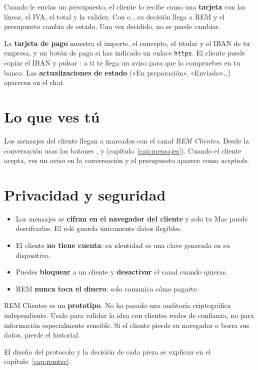 Cuando le envías un presupuesto, el cliente lo recibe como una \textbf{tarjeta} con las líneas, el IVA, el total y la validez. Con  o , su decisión llega a REM y el presupuesto cambia de estado. Una vez decidido, no se puede cambiar.

La \textbf{tarjeta de pago} muestra el importe, el concepto, el titular y el IBAN de tu empresa, y un botón de pago si has indicado un enlace \texttt{https}. El cliente puede copiar el IBAN y pulsar : a ti te llega un aviso para que lo compruebes en tu banco. Las \textbf{actualizaciones de estado} («En preparación», «Enviado»…) aparecen en el chat.

\section{Lo que ves tú}
Los mensajes del cliente llegan a  marcados con el canal \emph{REM Clientes}. Desde la conversación usas los botones ,  y  (capítulo~\ref{cap:mensajes}). Cuando el cliente acepta, ves un aviso en la conversación y el presupuesto aparece como \emph{aceptado}.

\section{Privacidad y seguridad}
\begin{itemize}
\item Los mensajes se \textbf{cifran en el navegador del cliente} y solo tu Mac puede descifrarlos. El relé guarda únicamente datos ilegibles.
\item El cliente \textbf{no tiene cuenta}: su identidad es una clave generada en su dispositivo.
\item Puedes \textbf{bloquear} a un cliente y \textbf{desactivar} el canal cuando quieras.
\item REM \textbf{nunca toca el dinero}: solo comunica cómo pagarte.
\end{itemize}
\begin{warnbox}
REM Clientes es un \textbf{prototipo}. No ha pasado una auditoría criptográfica independiente. Úsalo para validar la idea con clientes reales de confianza, no para información especialmente sensible. Si el cliente pierde su navegador o borra sus datos, pierde el historial.
\end{warnbox}
El diseño del protocolo y la decisión de cada pieza se explican en el capítulo~\ref{cap:remtec}.
